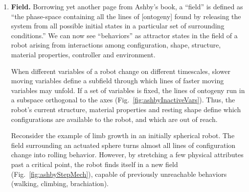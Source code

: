 \begin{enumerate}
    Without invoking a \textit{Deus ex machina}, a line of ontogeny can only be formed by the robot's state and the condition of its immediate surroundings.
    Decomposing state into modules that on one hand ``steer'' and on the other ``are steered'', is an example of what \citet{bennett2003philosophical} call a mereological\footnote{%
    From the Greek $\mu\acute{\varepsilon}\rho{o}\varsigma$ %
    \textit{meros}: ``a part, a fraction''.
    } 
    fallacy (e.g.~``brains predict'' \cite{clark2013whatever}).
    Thus ``controller'' is formally identical (isomorphic) to ``state'' and redundant in our ontology.
    But it is nevertheless
    useful (Fig.~\ref{fig:policy}).
    
    
    \item \textbf{Field.}
    Borrowing yet another page from Ashby's book, a ``field'' is defined as ``the phase-space containing all the lines of 
    [ontogeny] 
    found by releasing the system from all possible initial states in a particular set of surrounding conditions.''
    We can now see ``behaviors'' as attractor states in the field of a robot arising from interactions among configuration, shape, structure, material properties, 
    controller 
    and environment.

    When different variables of a robot change on different timescales, slower moving variables define a subfield through which lines of faster moving variables may unfold.
    If a set of variables is fixed, the lines of ontogeny run in a subspace orthogonal to the axes (Fig.~\ref{fig:ashbyInactiveVars}).
    Thus, the robot's current structure, material properties and resting shape define which configurations are available to the robot, 
    and which are out of reach.
    
    Reconsider the example of limb growth in an initially spherical robot.
    The field 
    surrounding 
    an actuated sphere turns almost all lines of configuration change into rolling behavior.
    However, by stretching a few physical attributes past a critical point,
    the robot finds itself in a new field (Fig.~\ref{fig:ashbyStepMech}), capable of previously unreachable behaviors (walking, climbing, brachiation).
    

\end{enumerate}
